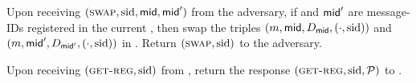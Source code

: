 \begin{cccFunctionality}
\begin{cccItemize}[nosep]
            \item Upon receiving $(\textsc{swap}, \mathrm{sid}, \mathsf{mid}, \mathsf{mid}')$ from the adversary, if \msgid and $\mathsf{mid}'$ are message-IDs registered in the current \vecM, then swap the triples $(m, \mathsf{mid}, D_\mathsf{mid}, (\cdot, \mathrm{sid}))$ and $(m, \mathsf{mid}', D_{\mathsf{mid}'}, (\cdot, \mathrm{sid}))$ in \vecM.
            Return $(\textsc{swap}, \mathrm{sid})$ to the adversary.

            \item Upon receiving $(\textsc{get-reg}, \mathrm{sid})$ from \adv, return the response $(\textsc{get-reg}, \mathrm{sid}, \mathcal{P})$ to \adv.
      \end{cccItemize}
\end{cccFunctionality}